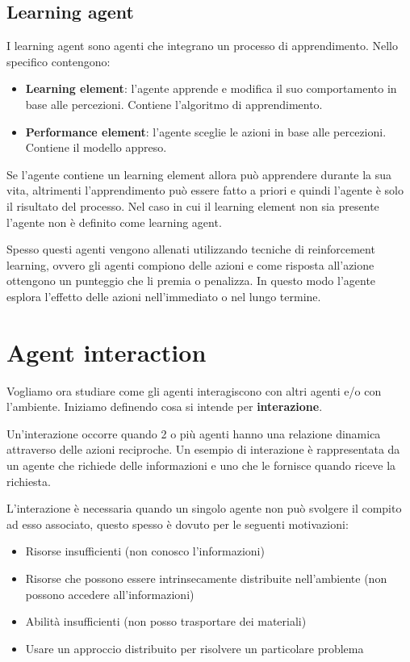 \subsection{Learning agent}
I learning agent sono agenti che integrano un processo di apprendimento. Nello
specifico contengono:
\begin{itemize}
    \item \textbf{Learning element}: l'agente apprende e modifica il suo comportamento
          in base alle percezioni. Contiene l'algoritmo di apprendimento.
    \item \textbf{Performance element}: l'agente sceglie le azioni in base alle
          percezioni. Contiene il modello appreso.
\end{itemize}

Se l'agente contiene un learning element allora può apprendere durante la sua vita,
altrimenti l'apprendimento può essere fatto a priori e quindi l'agente è solo il
risultato del processo. Nel caso in cui il learning element non sia presente
l'agente non è definito come learning agent.

Spesso questi agenti vengono allenati utilizzando tecniche di reinforcement
learning, ovvero gli agenti compiono delle azioni e come risposta all'azione
ottengono un punteggio che li premia o penalizza. In questo modo l'agente esplora
l'effetto delle azioni nell'immediato o nel lungo termine.

\section{Agent interaction}
Vogliamo ora studiare come gli agenti interagiscono con altri agenti e/o con
l'ambiente. Iniziamo definendo cosa si intende per \textbf{interazione}.
\begin{definizione}
    Un'interazione occorre quando 2 o più agenti hanno una relazione dinamica
    attraverso delle azioni reciproche. Un esempio di interazione è rappresentata
    da un agente che richiede delle informazioni e uno che le fornisce quando
    riceve la richiesta.
\end{definizione}
L'interazione è necessaria quando un singolo agente non può svolgere il compito
ad esso associato, questo spesso è dovuto per le seguenti motivazioni:
\begin{itemize}
    \item Risorse insufficienti (non conosco l'informazioni)
    \item Risorse che possono essere intrinsecamente distribuite nell'ambiente
          (non possono accedere all'informazioni)
    \item Abilità insufficienti (non posso trasportare dei materiali)
    \item Usare un approccio distribuito per risolvere un particolare problema
\end{itemize}

